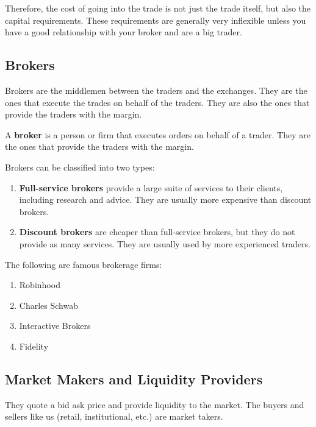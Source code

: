 \documentclass{article}
\begin{document}
    Therefore, the cost of going into the trade is not just the trade itself, but also the capital requirements. These requirements are generally very inflexible unless you have a good relationship with your broker and are a big trader. 

  \subsection{Brokers}

    Brokers are the middlemen between the traders and the exchanges. They are the ones that execute the trades on behalf of the traders. They are also the ones that provide the traders with the margin. 

    \begin{definition}[Broker]
      A \textbf{broker} is a person or firm that executes orders on behalf of a trader. They are the ones that provide the traders with the margin. 
    \end{definition}

    Brokers can be classified into two types: 
    \begin{enumerate}
      \item \textbf{Full-service brokers} provide a large suite of services to their clients, including research and advice. They are usually more expensive than discount brokers. 
      \item \textbf{Discount brokers} are cheaper than full-service brokers, but they do not provide as many services. They are usually used by more experienced traders. 
    \end{enumerate}

    \begin{example}
      The following are famous brokerage firms: 
      \begin{enumerate}
        \item Robinhood 
        \item Charles Schwab 
        \item Interactive Brokers
        \item Fidelity
      \end{enumerate}
    \end{example}

  \subsection{Market Makers and Liquidity Providers}

    They quote a bid ask price and provide liquidity to the market. The buyers and sellers like us (retail, institutional, etc.) are market takers. 
\end{document}
